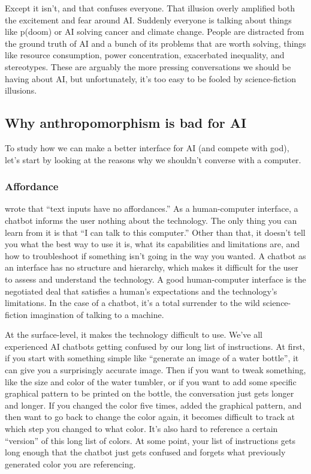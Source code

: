 \documentclass[12pt]{article}
\begin{document}
Except it isn't, and that confuses everyone. That illusion overly amplified both the excitement and fear around AI. Suddenly everyone is talking about things like p(doom) or AI solving cancer and climate change. People are distracted from the ground truth of AI and a bunch of its problems that are worth solving, things like resource consumption, power concentration, exacerbated inequality, and stereotypes. These are arguably the more pressing conversations we should be having about AI, but unfortunately, it's too easy to be fooled by science-fiction illusions.

\subsection{Why anthropomorphism is bad for AI}
To study how we can make a better interface for AI (and compete with god), let's start by looking at the reasons why we shouldn't converse with a computer.
\subsubsection{Affordance}
\cite{boo-chatbot} wrote that ``text inputs have no affordances.'' As a human-computer interface, a chatbot informs the user nothing about the technology. The only thing you can learn from it is that ``I can talk to this computer.'' Other than that, it doesn't tell you what the best way to use it is, what its capabilities and limitations are, and how to troubleshoot if something isn't going in the way you wanted. A chatbot as an interface has no structure and hierarchy, which makes it difficult for the user to assess and understand the technology. A good human-computer interface is the negotiated deal that satisfies a human's expectations and the technology's limitations. In the case of a chatbot, it's a total surrender to the wild science-fiction imagination of talking to a machine.

At the surface-level, it makes the technology difficult to use. We've all experienced AI chatbots getting confused by our long list of instructions. At first, if you start with something simple like ``generate an image of a water bottle'', it can give you a surprisingly accurate image. Then if you want to tweak something, like the size and color of the water tumbler, or if you want to add some specific graphical pattern to be printed on the bottle, the conversation just gets longer and longer. If you changed the color five times, added the graphical pattern, and then want to go back to change the color again, it becomes difficult to track at which step you changed to what color. It's also hard to reference a certain ``version'' of this long list of colors. At some point, your list of instructions gets long enough that the chatbot just gets confused and forgets what previously generated color you are referencing.
\end{document}
